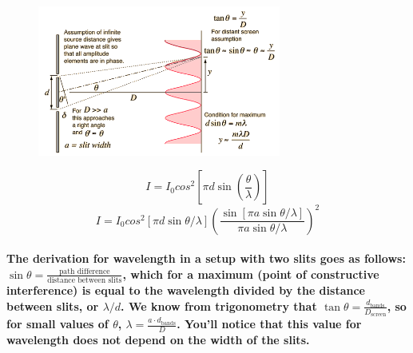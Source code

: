 \documentclass[double]{amsart}
\begin{document}
\begin{figure}[H]
\begin{minipage}{.49\textwidth}
\centering
\includegraphics[width=8cm]{doubsli.png}
\end{minipage}
%
\begin{minipage}{.49\textwidth}
\begin{equation}
I = I_0 cos^2\left[\pi d \sin\left(\frac{\theta}{\lambda}\right)\right]
\end{equation}
\begin{equation}
I = I_0 cos^2\left[\pi d  \sin \theta / \lambda \right]\left(\dfrac{\sin [\pi a  \sin\theta/\lambda]}{\pi a \sin\theta / \lambda}\right)^{2}
\end{equation}
\end{minipage}
\end{figure}

 \paragraph{The derivation for wavelength in a setup with two slits goes as follows: $\sin\theta = \frac{\text{path difference}}{\text{distance between slits}}$, which for a maximum (point of constructive interference) is equal to the wavelength divided by the distance between slits, or $\lambda/d$. We know from trigonometry that $\tan\theta = \frac{d_\text{bands}}{D_\text{screen}}$, so for small values of $\theta$, $\lambda = \frac{a\cdot d_{\text{bands}}}{D}$. You'll notice that this value for wavelength does not depend on the width of the slits. }
\end{document}
